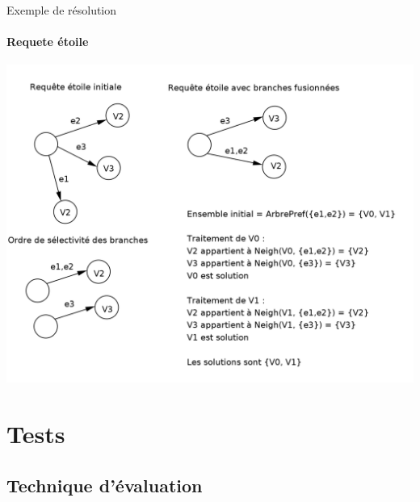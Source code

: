 \documentclass[french]{beamer}
\begin{document}
\begin{frame}{Exemple de résolution}
  \framesubtitle{Requete étoile}

  \includegraphics[scale=0.7]{images/query.png}

\end{frame}

\section[Tests]{Tests}

\subsection[Technique d'évaluation]{Technique d'évaluation}
\end{document}
